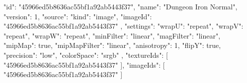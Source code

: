 {
  "id": "45966ed5b8636ac55bf1a92ab5443f37",
  "name": "Dungeon Iron Normal",
  "version": 1,
  "source": {
    "kind": "image",
    "imageId": "45966ed5b8636ac55bf1a92ab5443f37"
  },
  "settings": {
    "wrapU": "repeat",
    "wrapV": "repeat",
    "wrapW": "repeat",
    "minFilter": "linear",
    "magFilter": "linear",
    "mipMap": true,
    "mipMapFilter": "linear",
    "anisotropy": 1,
    "flipY": true,
    "precision": "low",
    "colorSpace": "srgb"
  },
  "textureIds": [
    "45966ed5b8636ac55bf1a92ab5443f37"
  ],
  "imageIds": [
    "45966ed5b8636ac55bf1a92ab5443f37"
  ]
}
